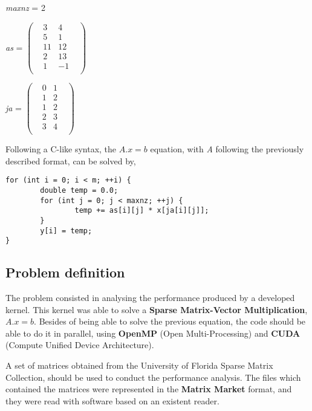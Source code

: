 \documentclass[12pt]{article}
\begin{document}
\begin{center}
\textit{maxnz}  =  2 
\linebreak
\linebreak

\begin{minipage}{.4\textwidth}
  \center
  \textit{as}  =   
$
\begin{pmatrix}
    & 3 & 4 & \\
    & 5 & 1 & \\
    & 11 & 12 & \\
    & 2 & 13 & \\
    & 1 & -1 & \\
\end{pmatrix}
$
\end{minipage}%
\begin{minipage}{.4\textwidth}
 \center
  \textit{ja}  =   
$
\begin{pmatrix}
    & 0 & 1 & \\
    & 1 & 2 & \\
    & 1 & 2 & \\
    & 2 & 3 & \\
    & 3 & 4 & \\
\end{pmatrix}
$
\end{minipage}
\linebreak
\end{center}

\par Following a C-like syntax, the $A . x = b$ equation, with \textit{A} following the previously described format, can be solved by,


\begin{lstlisting}
for (int i = 0; i < m; ++i) {
		double temp = 0.0;
		for (int j = 0; j < maxnz; ++j) {
				temp += as[i][j] * x[ja[i][j]];
		}
		y[i] = temp;
}	
\end{lstlisting}

 
\subsection*{Problem definition}

\par The problem consisted in analysing the performance produced by a developed kernel. This kernel was able to solve a \textbf{Sparse Matrix-Vector Multiplication}, $A.x = b$. Besides of being able to solve the previous equation, the code should be able to do it in parallel, using \textbf{OpenMP} (Open Multi-Processing) and \textbf{CUDA} (Compute Unified Device Architecture).
\par A set of matrices obtained from the University of Florida Sparse Matrix Collection\cite{sparse-matrices}, should be used to conduct the performance analysis. The files which contained the matrices were represented in the \textbf{Matrix Market} format, and they were read with software based on an existent reader. \cite{matrix-reader} 
\end{document}
